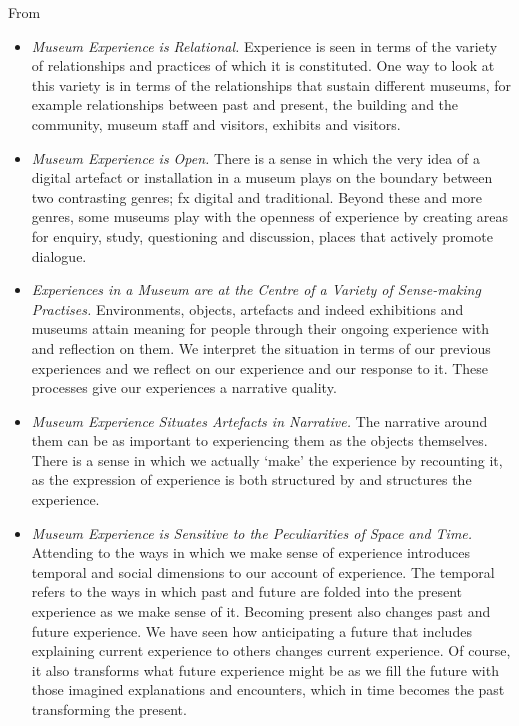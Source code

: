 From \autocite[]{}
\begin{itemize}
    \item \emph{Museum Experience is Relational.} Experience is seen in terms of the variety of relationships and practices of which it is constituted. One way to look at this variety is in terms of the relationships that sustain different museums, for example relationships between past and present, the building and the community, museum staff and visitors, exhibits and visitors. 
    
    \item \emph{Museum Experience is Open.} There is a sense in which the very idea of a digital artefact or installation in a museum plays on the boundary between two contrasting genres; fx digital and traditional. Beyond these and more genres, some museums play with the openness of experience by creating areas for enquiry, study, questioning and discussion, places that actively promote dialogue.

    \item \emph{Experiences in a Museum are at the Centre of a Variety of Sense-making Practises.} Environments, objects, artefacts and indeed exhibitions and museums attain meaning for people through their ongoing experience with and reflection on them. We interpret the situation in terms of our previous experiences and we reflect on our experience and our response to it. These processes give our experiences a narrative quality.
    
    \item \emph{Museum Experience Situates Artefacts in Narrative.} The narrative around them can be as important to experiencing them as the objects themselves. There is a sense in which we actually ‘make’ the experience by recounting it, as the expression of experience is both structured by and structures the experience. 
    
    \item \emph{Museum Experience is Sensitive to the Peculiarities of Space and Time.} Attending to the ways in which we make sense of experience introduces temporal and social dimensions to our account of experience. The temporal refers to the ways in which past and future are folded into the present experience as we make sense of it. Becoming present also changes past and future experience. We have seen how anticipating a future that includes explaining current experience to others changes current experience. Of course, it also transforms what future experience might be as we fill the future with those imagined explanations and encounters, which in time becomes the past transforming the present. 

\end{itemize}



